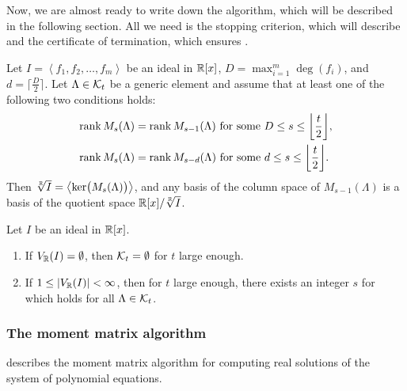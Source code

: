 Now, we are almost ready to write down the algorithm, which will be described in the following section.
All we need is the stopping criterion, which will describe  and the certificate of termination, which ensures .

\begin{theorem}
  Let $I = \left<f_1, f_2, \ldots, f_m\right>$ be an ideal in $\mathbb{R}[x]$, $D = \max_{i=1}^m\deg(f_i)$, and $d = \Big\lceil \frac{D}{2} \Big\rceil$.
  Let $\Lambda\in\mathcal{K}_t$ be a generic element and assume that at least one of the following two conditions holds:
  \begin{align}
    \rank\MLs &= \rank M_{s-1}(\Lambda) \text{ for some } D\leq s \leq \bigg\lfloor \frac{t}{2} \bigg\rfloor,\labeleq{POP:sol:stop1}\\
    \rank\MLs &= \rank M_{s-d}(\Lambda) \text{ for some } d\leq s \leq \bigg\lfloor \frac{t}{2} \bigg\rfloor.\labeleq{POP:sol:stop2}
  \end{align}
Then $\sqrt[\mathbb{R}]{I}=\left<\operatorname{ker}\!\big(M_s(\Lambda)\big)\right>$, and any basis of the column space of $M_{s-1}(\Lambda)$ is a basis of the quotient space $\mathbb{R}[x]/\sqrt[\mathbb{R}]{I}$.
\end{theorem}

\begin{theorem}
  Let $I$ be an ideal in $\mathbb{R}[x]$.
  \begin{enumerate}
    \item If $V_{\mathbb{R}}(I)=\emptyset$, then $\mathcal{K}_t=\emptyset$ for $t$ large enough.
    \item If $1\leq|V_{\mathbb{R}}(I)|<\infty$, then for $t$ large enough, there exists an integer $s$ for which  holds for all $\Lambda\in\mathcal{K}_t$.
  \end{enumerate}
\end{theorem}

\subsubsection{The moment matrix algorithm}
 describes the moment matrix algorithm for computing real solutions of the system of polynomial equations.



